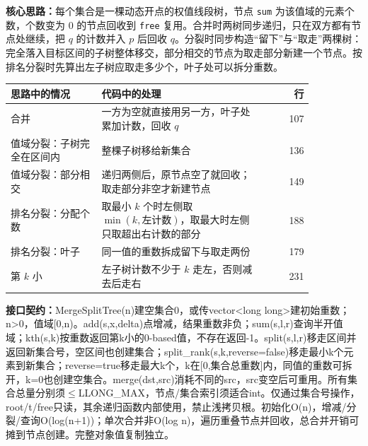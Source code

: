 \textbf{核心思路：}\allowbreak 每个集合是一棵动态开点的权值线段树，节点 \texttt{sum} 为该值域的元素个数，个数变为 0 的节点回收到 \texttt{free} 复用。合并时两树同步递归，只在双方都有节点处继续，把 $q$ 的计数并入 $p$ 后回收 $q$。分裂时同步构造“留下”与“取走”两棵树：完全落入目标区间的子树整体移交，部分相交的节点为取走部分新建一个节点。按排名分裂时先算出左子树应取走多少个，叶子处可以拆分重数。

\begin{center}\small
\begin{tabular}{@{}p{0.30\linewidth}p{0.55\linewidth}r@{}}
\toprule
思路中的情况 & 代码中的处理 & 行\\
\midrule
合并 & 一方为空就直接用另一方，叶子处累加计数，回收 $q$ & 107\\
值域分裂：子树完全在区间内 & 整棵子树移给新集合 & 136\\
值域分裂：部分相交 & 递归两侧后，原节点空了就回收；取走部分非空才新建节点 & 149\\
排名分裂：分配个数 & 取最小 $k$ 个时左侧取 $\min(k,\text{左计数})$，取最大时左侧只取超出右计数的部分 & 188\\
排名分裂：叶子 & 同一值的重数拆成留下与取走两份 & 179\\
第 $k$ 小 & 左子树计数不少于 $k$ 走左，否则减去后走右 & 231\\
\bottomrule
\end{tabular}
\end{center}



{\sloppy{}\noindent\textbf{接口契约：}MergeSplitTree(n)建空集合0，或传vector<long long>建初始重数；n>0，值域[0,n)。add(s,x,delta)点增减，结果重数非负；sum(s,l,r)查询半开值域；kth(s,k)按重数返回第k小的0-based值，不存在返回-1。split(s,l,r)移走区间并返回新集合号，空区间也创建集合；split\_rank(s,k,reverse=false)移走最小k个元素到新集合；reverse=true移走最大k个，k在[0,集合总重数]内，同值的重数可拆开，k=0也创建空集合。merge(dst,src)消耗不同的src，src变空后可重用。所有集合总量分别须$\le$LLONG\_MAX，节点/集合索引须适合int。仅通过集合号操作，root/t/free只读，其余递归函数内部使用，禁止浅拷贝根。初始化O(n)，增减/分裂/查询O(log(n+1))；单次合并非O(log n)，遍历重叠节点并回收，总合并开销可摊到节点创建。完整对象值复制独立。\par}

\Needspace{492pt}



\newpage

